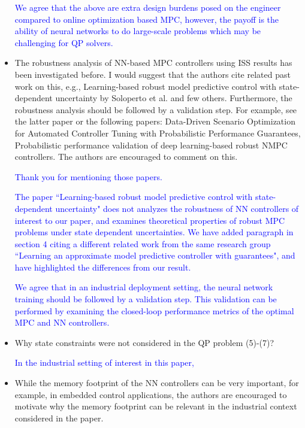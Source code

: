 \documentclass[xcolor=dvipsnames, 11pt]{article}
\newcommand{\reply}[1]{\textcolor{blue}{#1}}
\begin{document}
\begin{itemize}
  \reply{We agree that the above are extra design burdens posed on the engineer compared to online optimization based MPC, however, the payoff is the ability of neural networks to do large-scale problems which may be challenging for QP solvers.}

  \item  The robustness analysis of NN-based MPC controllers using ISS results has been investigated before. I would suggest that the authors cite related past work on this, e.g., Learning-based robust model predictive control with state-dependent uncertainty by Soloperto et al. and few others. Furthermore, the robustness analysis should be followed by a validation step. For example, see the latter paper or the following papers: Data-Driven Scenario Optimization for Automated Controller Tuning with Probabilistic Performance Guarantees, Probabilistic performance validation of deep learning-based robust NMPC controllers. The authors are encouraged to comment on this.
  
  \reply{Thank you for mentioning those papers.}

  \reply{The paper ``Learning-based robust model predictive control with state-dependent uncertainty" does not analyzes the robustness of NN controllers of interest to our paper, and examines theoretical properties of robust MPC problems under state dependent uncertainties. We have added paragraph in section 4 citing a different related work from the same research group ``Learning an approximate model predictive controller with guarantees", and have highlighted the differences from our result.}

  \reply{We agree that in an industrial deployment setting, the neural network training should be followed by a validation step. This validation can be performed by examining the closed-loop performance metrics of the optimal MPC and NN controllers.}

  \item Why state constraints were not considered in the QP problem (5)-(7)?

  \reply{In the industrial setting of interest in this paper, }
  
  \item While the memory footprint of the NN controllers can be very important, for example, in embedded control applications, the authors are encouraged to motivate why the memory footprint can be relevant in the industrial context considered in the paper.
\end{itemize}
\end{document}

